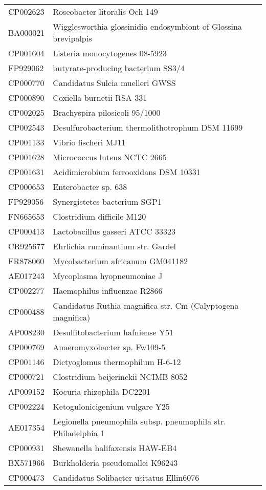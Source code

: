 \begin{longtable}{ll}
CP002623 & Roseobacter litoralis Och 149\\
BA000021 & Wigglesworthia glossinidia endosymbiont of Glossina brevipalpis\\
CP001604 & Listeria monocytogenes 08-5923\\
FP929062 & butyrate-producing bacterium SS3/4\\
CP000770 & Candidatus Sulcia muelleri GWSS\\
CP000890 & Coxiella burnetii RSA 331\\
CP002025 & Brachyspira pilosicoli 95/1000\\
CP002543 & Desulfurobacterium thermolithotrophum DSM 11699\\
CP001133 & Vibrio fischeri MJ11\\
CP001628 & Micrococcus luteus NCTC 2665\\
CP001631 & Acidimicrobium ferrooxidans DSM 10331\\
CP000653 & Enterobacter sp. 638\\
FP929056 & Synergistetes bacterium SGP1\\
FN665653 & Clostridium difficile M120\\
CP000413 & Lactobacillus gasseri ATCC 33323\\
CR925677 & Ehrlichia ruminantium str. Gardel\\
FR878060 & Mycobacterium africanum GM041182\\
AE017243 & Mycoplasma hyopneumoniae J\\
CP002277 & Haemophilus influenzae R2866\\
CP000488 & Candidatus Ruthia magnifica str. Cm (Calyptogena magnifica)\\
AP008230 & Desulfitobacterium hafniense Y51\\
CP000769 & Anaeromyxobacter sp. Fw109-5\\
CP001146 & Dictyoglomus thermophilum H-6-12\\
CP000721 & Clostridium beijerinckii NCIMB 8052\\
AP009152 & Kocuria rhizophila DC2201\\
CP002224 & Ketogulonicigenium vulgare Y25\\
AE017354 & Legionella pneumophila subsp. pneumophila str. Philadelphia 1\\
CP000931 & Shewanella halifaxensis HAW-EB4\\
BX571966 & Burkholderia pseudomallei K96243\\
CP000473 & Candidatus Solibacter usitatus Ellin6076\\

\end{longtable}
